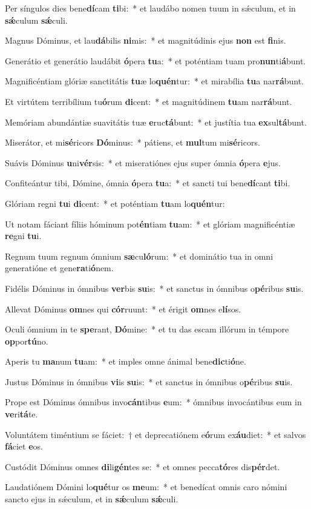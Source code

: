 \item Per síngulos dies bene\textbf{dí}cam \textbf{ti}bi:~* et laudábo nomen tuum in sǽculum, et in \textbf{sǽ}culum \textbf{sǽ}culi.
\item Magnus Dóminus, et lau\textbf{dá}bilis \textbf{ni}mis:~* et magnitúdinis ejus \textbf{non} est \textbf{fi}nis.
\item Generátio et generátio laudábit \textbf{ó}pera \textbf{tu}a:~* et poténtiam tuam pro\textbf{nun}ti\textbf{á}bunt.
\item Magnificéntiam glóriæ sanctitátis \textbf{tu}æ lo\textbf{quén}tur:~* et mirabília \textbf{tu}a nar\textbf{rá}bunt.
\item Et virtútem terribílium tu\textbf{ó}rum \textbf{di}cent:~* et magnitúdinem \textbf{tu}am nar\textbf{rá}bunt.
\item Memóriam abundántiæ suavitátis tuæ \textbf{e}ruc\textbf{tá}bunt:~* et justítia tua \textbf{ex}sul\textbf{tá}bunt.
\item Miserátor, et mi\textbf{sé}ricors \textbf{Dó}minus:~* pátiens, et \textbf{mul}tum mi\textbf{sé}ricors.
\item Suávis Dóminus \textbf{u}ni\textbf{vér}sis:~* et miseratiónes ejus super ómnia \textbf{ó}pera \textbf{e}jus.
\item Confiteántur tibi, Dómine, ómnia \textbf{ó}pera \textbf{tu}a:~* et sancti tui bene\textbf{dí}cant \textbf{ti}bi.
\item Glóriam regni \textbf{tu}i \textbf{di}cent:~* et poténtiam \textbf{tu}am lo\textbf{quén}tur:
\item Ut notam fáciant fíliis hóminum pot\textbf{én}tiam \textbf{tu}am:~* et glóriam magnificéntiæ \textbf{re}gni \textbf{tu}i.
\item Regnum tuum regnum ómnium \textbf{sæ}cu\textbf{ló}rum:~* et dominátio tua in omni generatióne et gene\textbf{ra}ti\textbf{ó}nem.
\item Fidélis Dóminus in ómnibus \textbf{ver}bis \textbf{su}is:~* et sanctus in ómnibus o\textbf{pé}ribus \textbf{su}is.
\item Allevat Dóminus \textbf{om}nes qui \textbf{cór}ruunt:~* et érigit \textbf{om}nes e\textbf{lí}sos.
\item Oculi ómnium in te \textbf{spe}rant, \textbf{Dó}mine:~* et tu das escam illórum in témpore \textbf{op}por\textbf{tú}no.
\item Aperis tu \textbf{ma}num \textbf{tu}am:~* et imples omne ánimal bene\textbf{dic}ti\textbf{ó}ne.
\item Justus Dóminus in ómnibus \textbf{vi}is \textbf{su}is:~* et sanctus in ómnibus o\textbf{pé}ribus \textbf{su}is.
\item Prope est Dóminus ómnibus invo\textbf{cán}tibus \textbf{e}um:~* ómnibus invocántibus eum in \textbf{ve}ri\textbf{tá}te.
\item Voluntátem timéntium se fáciet:~† et deprecatiónem e\textbf{ó}rum ex\textbf{áu}diet:~* et salvos \textbf{fá}ciet \textbf{e}os.
\item Custódit Dóminus omnes \textbf{di}li\textbf{gén}tes se:~* et omnes pecca\textbf{tó}res dis\textbf{pér}det.
\item Laudatiónem Dómini lo\textbf{qué}tur os \textbf{me}um:~* et benedícat omnis caro nómini sancto ejus in sǽculum, et in \textbf{sǽ}culum \textbf{sǽ}culi.

